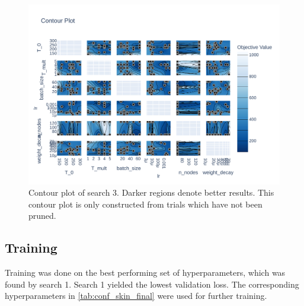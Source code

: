 \begin{figure}
    \centering
    \includegraphics[angle=90,width=0.9\textheight, height=\linewidth,keepaspectratio]{skinstression/images/hyperparameter-search/search-3/contour.pdf}
    \caption[Search 3 contour plot]{
        Contour plot of search 3.
        Darker regions denote better results.
        This contour plot is only constructed from trials which have not been pruned.
    }
    \label{fig:skinstression-search3-contour}
\end{figure}

\subsection{Training}
Training was done on the best performing set of hyperparameters, which was found by search 1.
Search 1 yielded the lowest validation loss.
The corresponding hyperparameters in \cref{tab:conf_skin_final} were used for further training.

